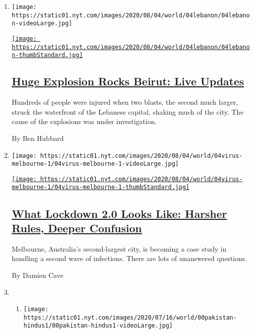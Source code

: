 \begin{enumerate}
\def\labelenumi{\arabic{enumi}.}
\item
  \texttt{[image: https://static01.nyt.com/images/2020/08/04/world/04lebanon/04lebanon-videoLarge.jpg]}

  \href{/2020/08/04/world/middleeast/beirut-explosion-blast.html}{\texttt{[image: https://static01.nyt.com/images/2020/08/04/world/04lebanon/04lebanon-thumbStandard.jpg]}}

  \hypertarget{huge-explosion-rocks-beirut-live-updates}{%
  \subsection{\texorpdfstring{\href{/2020/08/04/world/middleeast/beirut-explosion-blast.html}{Huge
  Explosion Rocks Beirut: Live
  Updates}}{Huge Explosion Rocks Beirut: Live Updates}}\label{huge-explosion-rocks-beirut-live-updates}}

  Hundreds of people were injured when two blasts, the second much
  larger, struck the waterfront of the Lebanese capital, shaking much of
  the city. The cause of the explosions was under investigation.

  By Ben Hubbard
\item
  \texttt{[image: https://static01.nyt.com/images/2020/08/04/world/04virus-melbourne-1/04virus-melbourne-1-videoLarge.jpg]}

  \href{/2020/08/04/world/australia/coronavirus-melbourne-lockdown.html}{\texttt{[image: https://static01.nyt.com/images/2020/08/04/world/04virus-melbourne-1/04virus-melbourne-1-thumbStandard.jpg]}}

  \hypertarget{what-lockdown-20-looks-like-harsher-rules-deeper-confusion}{%
  \subsection{\texorpdfstring{\href{/2020/08/04/world/australia/coronavirus-melbourne-lockdown.html}{What
  Lockdown 2.0 Looks Like: Harsher Rules, Deeper
  Confusion}}{What Lockdown 2.0 Looks Like: Harsher Rules, Deeper Confusion}}\label{what-lockdown-20-looks-like-harsher-rules-deeper-confusion}}

  Melbourne, Australia's second-largest city, is becoming a case study
  in handling a second wave of infections. There are lots of unanswered
  questions.

  By Damien Cave
\item
  \begin{enumerate}
  \def\labelenumii{\arabic{enumii}.}
  \item
    \texttt{[image: https://static01.nyt.com/images/2020/07/16/world/00pakistan-hindus1/00pakistan-hindus1-videoLarge.jpg]}


\end{enumerate}
\end{enumerate}
